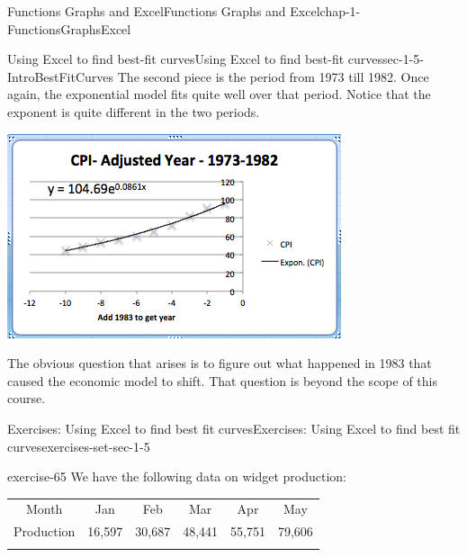 \documentclass[oneside,10pt,]{book}
\numberwithin{equation}{section}
\newcommand{\hrulethin}  {\noalign{\hrule height 0.04em}}
\newcommand{\hrulemedium}{\noalign{\hrule height 0.07em}}
\newcommand{\hrulethick} {\noalign{\hrule height 0.11em}}
\begin{document}
\begin{chapterptx}{Functions Graphs and Excel}{}{Functions Graphs and Excel}{}{}{chap-1-FunctionsGraphsExcel}
\begin{sectionptx}{Using Excel to find best-fit curves}{}{Using Excel to find best-fit curves}{}{}{sec-1-5-IntroBestFitCurves}
\hypertarget{p-403}{}%
The second piece is the period from 1973 till 1982.  Once again, the exponential model fits quite well over that period.  Notice that the exponent is quite different in the two periods.%
\begin{sidebyside}{1}{0.1}{0.1}{0}%
\begin{sbspanel}{0.8}%
\includegraphics[width=1\linewidth]{images/sec1-5-16.png}
\end{sbspanel}%
\end{sidebyside}%
\par
\hypertarget{p-404}{}%
The obvious question that arises is to figure out what happened in 1983 that caused the economic model to shift.  That question is beyond the scope of this course.%
%
%
\typeout{************************************************}
\typeout{************************************************}
%
\begin{exercises-subsection-numberless}{Exercises: Using Excel to find best fit curves}{}{Exercises: Using Excel to find best fit curves}{}{}{exercises-set-sec-1-5}
\begin{divisionexercise}{1}{}{}{exercise-65}%
\hypertarget{p-405}{}%
We have the following data on widget production:%
\begin{sidebyside}{1}{0}{0}{0}%
\begin{sbspanel}{1}%
{\centering%
\begin{tabular}{cccccc}\hrulethick
Month&Jan&Feb&Mar&Apr&May\tabularnewline\hrulethin
Production&16,597&30,687&48,441&55,751&79,606\tabularnewline\hrulemedium
\end{tabular}
\par}
\end{sbspanel}%
\end{sidebyside}%

\end{divisionexercise}
\end{exercises-subsection-numberless}
\end{sectionptx}
\end{chapterptx}
\end{document}
